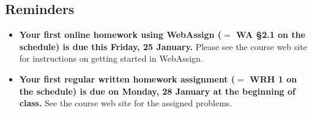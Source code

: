 \documentclass[12pt]{article}
\begin{document}
\renewcommand{\d}{\displaystyle}

\subsection*{Reminders}
\begin{itemize}
\item \textbf{Your first online homework using WebAssign ($=$ WA \S2.1 on the schedule) is due this Friday, 25 January.}  Please see the course web site for instructions on getting started in WebAssign.
\item \textbf{Your first regular written homework assignment ($=$ WRH 1 on the schedule) is due on Monday, 28 January at the beginning of class.}  See the course web site for the assigned problems.
\end{itemize}
\end{document}
